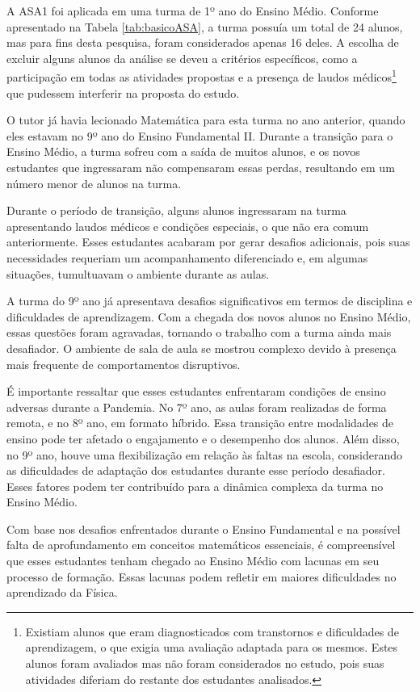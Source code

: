 A ASA1 foi aplicada em uma turma de 1º ano do Ensino Médio. Conforme apresentado na Tabela \ref{tab:basicoASA}, a turma possuía um total de 24 alunos, mas para fins desta pesquisa, foram considerados apenas 16 deles. A escolha de excluir alguns alunos da análise se deveu a critérios específicos, como a participação em todas as atividades propostas e a presença de laudos médicos\footnote{Existiam alunos que eram diagnosticados com transtornos e dificuldades de aprendizagem, o que exigia uma avaliação adaptada para os mesmos. Estes alunos foram avaliados mas não foram considerados no estudo, pois suas atividades diferiam do restante dos estudantes analisados.} que pudessem interferir na proposta do estudo. 

O tutor já havia lecionado Matemática para esta turma no ano anterior, quando eles estavam no 9º ano do Ensino Fundamental II. Durante a transição para o Ensino Médio, a turma sofreu com a saída de muitos alunos, e os novos estudantes que ingressaram não compensaram essas perdas, resultando em um número menor de alunos na turma.

Durante o período de transição, alguns alunos ingressaram na turma apresentando laudos médicos e condições especiais, o que não era comum anteriormente. Esses estudantes acabaram por gerar desafios adicionais, pois suas necessidades requeriam um acompanhamento diferenciado e, em algumas situações, tumultuavam o ambiente durante as aulas.

A turma do 9º ano já apresentava desafios significativos em termos de disciplina e dificuldades de aprendizagem. Com a chegada dos novos alunos no Ensino Médio, essas questões foram agravadas, tornando o trabalho com a turma ainda mais desafiador. O ambiente de sala de aula se mostrou complexo devido à presença mais frequente de comportamentos disruptivos.

É importante ressaltar que esses estudantes enfrentaram condições de ensino adversas durante a Pandemia. No 7º ano, as aulas foram realizadas de forma remota, e no 8º ano, em formato híbrido. Essa transição entre modalidades de ensino pode ter afetado o engajamento e o desempenho dos alunos. Além disso, no 9º ano, houve uma flexibilização em relação às faltas na escola, considerando as dificuldades de adaptação dos estudantes durante esse período desafiador. Esses fatores podem ter contribuído para a dinâmica complexa da turma no Ensino Médio.

Com base nos desafios enfrentados durante o Ensino Fundamental e na possível falta de aprofundamento em conceitos matemáticos essenciais, é compreensível que esses estudantes tenham chegado ao Ensino Médio com lacunas em seu processo de formação. Essas lacunas podem refletir em maiores dificuldades no aprendizado da Física.

